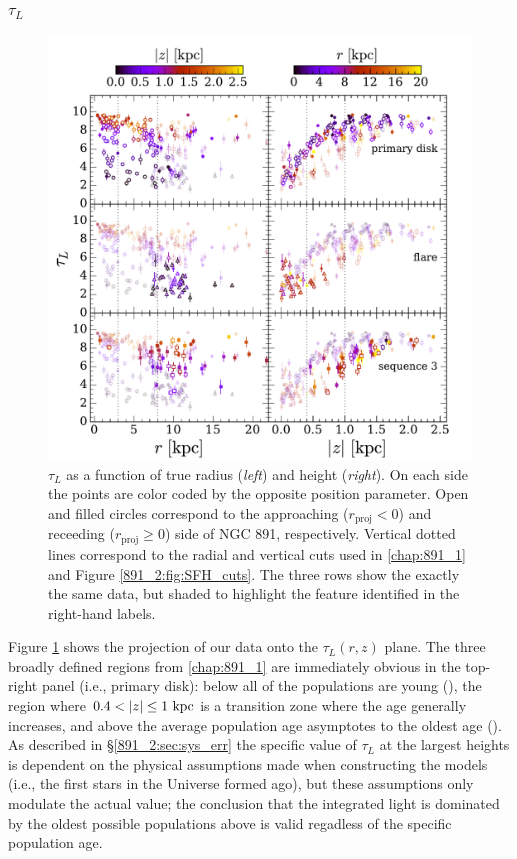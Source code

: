 \subsubsection{$\tau_L$}
\begin{figure}
  \centering
  \includegraphics[width=\textwidth]{891_2/figs/MLWA_rz_all.pdf}
  \caption[$\tau_L$ vs
    ($r,|z|$)]{\fixspacing\label{891_2:fig:MLWA_rz}$\tau_L$ as a
    function of true radius (\emph{left}) and height
    (\emph{right}). On each side the points are color coded by the
    opposite position parameter. Open and filled circles correspond to
    the approaching ($r_\mathrm{proj} < 0$) and receeding
    ($r_\mathrm{proj}\geq 0$) side of NGC 891, respectively. Vertical
    dotted lines correspond to the radial and vertical cuts used in
    \ref{chap:891_1} and Figure \ref{891_2:fig:SFH_cuts}. The three
    rows show the exactly the same data, but shaded to highlight the
    feature identified in the right-hand labels.}
\end{figure}

Figure \ref{891_2:fig:MLWA_rz} shows the projection of our data onto the
$\tau_L(r,z)$ plane. The three broadly defined regions from
\ref{chap:891_1} are immediately obvious in the top-right
panel (i.e., primary disk): below  all of the
populations are young (), the region where $0.4 < |z|
\leq 1~\mathrm{kpc} $ is a transition zone where the age generally
increases, and above  the average population age
asymptotes to the oldest age (). As described in
\S\ref{891_2:sec:sys_err} the specific value of $\tau_L$ at the largest
heights is dependent on the physical assumptions made when
constructing the models (i.e., the first stars in the Universe formed
 ago), but these assumptions only modulate the
actual value; the conclusion that the integrated light is dominated by
the oldest possible populations above  is valid regadless
of the specific population age.

